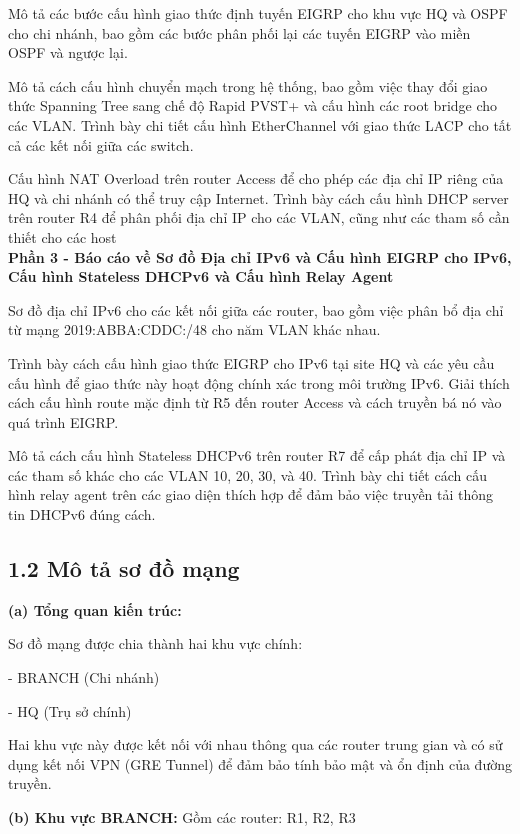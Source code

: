 \documentclass[13pt]{article}
\begin{document}
Mô tả các bước cấu hình giao thức định tuyến EIGRP cho khu vực HQ và OSPF cho chi nhánh, bao gồm các bước phân phối lại các tuyến EIGRP vào miền OSPF và ngược lại.

Mô tả cách cấu hình chuyển mạch trong hệ thống, bao gồm việc
thay đổi giao thức Spanning Tree sang chế độ Rapid PVST+ và
cấu hình các root bridge cho các VLAN. Trình bày chi tiết cấu
hình EtherChannel với giao thức LACP cho tất cả các kết nối giữa
các switch.

Cấu hình NAT Overload trên router Access để cho phép các địa chỉ
IP riêng của HQ và chi nhánh có thể truy cập Internet. Trình bày
cách cấu hình DHCP server trên router R4 để phân phối địa chỉ IP
cho các VLAN, cũng như các tham số cần thiết cho các host\\
\textbf{Phần 3 - Báo cáo về Sơ đồ Địa chỉ IPv6 và Cấu hình EIGRP cho IPv6, Cấu hình Stateless DHCPv6 và Cấu hình Relay Agent}

Sơ đồ địa chỉ IPv6 cho các kết nối giữa các router, bao gồm việc phân
bổ địa chỉ từ mạng 2019:ABBA:CDDC:/48 cho năm VLAN khác
nhau.

Trình bày cách cấu hình giao thức EIGRP cho IPv6 tại site HQ và
các yêu cầu cấu hình để giao thức này hoạt động chính xác trong
môi trường IPv6. Giải thích cách cấu hình route mặc định từ R5
đến router Access và cách truyền bá nó vào quá trình EIGRP.

Mô tả cách cấu hình Stateless DHCPv6 trên router
R7 để cấp phát địa chỉ IP và các tham số khác cho các VLAN 10,
20, 30, và 40. Trình bày chi tiết cách cấu hình relay agent trên các
giao diện thích hợp để đảm bảo việc truyền tải thông tin DHCPv6
đúng cách.



\subsection{1.2 Mô tả sơ đồ mạng}
\textbf{(a) Tổng quan kiến trúc:}

Sơ đồ mạng được chia thành hai khu vực chính:

- BRANCH (Chi nhánh)
        
- HQ (Trụ sở chính)

Hai khu vực này được kết nối với nhau thông qua các router trung gian và có sử dụng kết nối VPN (GRE Tunnel) để đảm bảo tính bảo mật và ổn định của đường truyền.
            


\textbf{(b) Khu vực BRANCH:}
Gồm các router: R1, R2, R3
\end{document}
